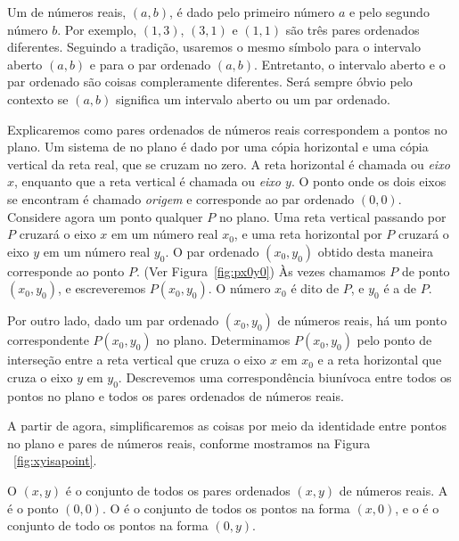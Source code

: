 Um  de números reais, $(a, b)$, é dado
pelo primeiro número $a$ e pelo segundo número $b$. Por exemplo, $(1, 3)$,
$(3, 1)$ e $(1, 1)$ são três pares ordenados
diferentes. Seguindo a tradição, usaremos o mesmo símbolo para o intervalo
aberto $(a, b)$ e para o par ordenado $(a, b)$. Entretanto, o intervalo
aberto e o par ordenado são coisas compleramente diferentes. Será sempre
óbvio pelo contexto se $(a, b)$ significa um intervalo aberto ou
um par ordenado.

Explicaremos como pares ordenados de números reais correspondem a
pontos no plano. Um sistema de  no
plano é dado por uma cópia horizontal e uma cópia vertical da reta
real, que se cruzam no zero. A reta horizontal é chamada  ou \emph{eixo $x$}, enquanto que a reta vertical é chamada
 ou \emph{eixo $y$}. O ponto onde os dois
eixos se encontram é chamado \emph{origem} e corresponde ao par
ordenado $(0, 0)$. Considere agora um ponto qualquer $P$ no plano. Uma
reta vertical passando por $P$ cruzará o eixo $x$ em um número real
$x_0$, e uma reta horizontal por $P$ cruzará o eixo $y$ em um número
real $y_0$. O par ordenado $(x_0, y_0)$  obtido desta maneira corresponde
ao ponto $P$. (Ver Figura~\ref{fig:px0y0}) Às vezes chamamos $P$ de ponto
$(x_0, y_0)$, e escreveremos $P(x_0, y_0)$. O número $x_0$ é dito
 de $P$, e $y_0$ é a  de $P$.

Por outro lado, dado um par ordenado $(x_0, y_0)$ de números reais, há um
ponto correspondente $P(x_0, y_0)$ no plano. Determinamos $P(x_0, y_0)$ pelo
ponto de interseção entre a reta vertical que cruza o eixo $x$ em $x_0$
e a reta horizontal que cruza o eixo $y$ em $y_0$. Descrevemos uma
correspondência biunívoca entre todos os pontos no plano e todos os
pares ordenados de números reais.

A partir de agora, simplificaremos as coisas por meio da identidade entre
pontos no plano e pares de números reais, conforme mostramos na Figura%
~\ref{fig:xyisapoint}.


\begin{defin}
O  $(x, y)$ é o conjunto de todos os pares ordenados $(x, y)$
de números reais. A  é o ponto $(0, 0)$. O 
é o conjunto de todos os pontos na forma $(x, 0)$, e o  é
o conjunto de todo os pontos na forma $(0, y)$. 
\end{defin}


